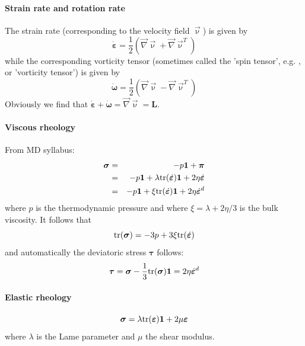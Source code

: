 
\paragraph{Strain rate and rotation rate}

The strain rate (corresponding to the velocity field $\vec\upnu$) is given by 
\[
\dot{\bm \varepsilon} = \frac12 ( \vec\nabla \vec\upnu + \vec\nabla \vec\upnu^T) 
\]
while the corresponding vorticity tensor
(sometimes called the 'spin tensor', e.g. \cite{moql07}, or 'vorticity tensor')  is given by
\[
\dot{\bm \omega} = \frac12 \left( \vec\nabla \vec\upnu - \vec\nabla \vec\upnu^T \right) 
\]
Obviously we find that $\dot{\bm \varepsilon}+\dot{\bm \omega}=\vec\nabla \vec\upnu  = {\bm L}$.



\paragraph{Viscous rheology}

From MD syllabus:
\begin{eqnarray}
{\bm \sigma} 
&=& -p {\bm 1} + {\bm \pi} \nonumber\\
&=& -p {\bm 1} + \lambda {\rm tr}(\dot{\bm \varepsilon}) {\bm 1} + 2 \eta \dot{\bm \varepsilon} \nonumber\\
&=& -p {\bm 1} + \xi {\rm tr}(\dot{\bm \varepsilon}) {\bm 1} + 2 \eta \dot{\bm \varepsilon}^d 
\end{eqnarray}
where $p$ is the thermodynamic pressure and 
where $\xi=\lambda+2\eta/3$ is the bulk viscosity. It follows that 
\begin{equation}
{\rm tr}({\bm \sigma}) = -3p + 3 \xi {\rm tr}(\dot{\bm \varepsilon}) \label{eq:trsigmav}
\end{equation}
and automatically the deviatoric stress ${\bm \tau}$ follows:
\begin{equation}
{\bm \tau} = {\bm \sigma} - \frac13 {\rm tr}({\bm \sigma}) {\bm 1} = 2 \eta \dot{\bm \varepsilon}^d \label{eq:ve:tauv}
\end{equation}


\paragraph{Elastic rheology}

\begin{equation}
{\bm \sigma} = \lambda {\rm tr}({\bm \varepsilon}) {\bm 1} + 2 \mu {\bm \varepsilon}
\end{equation}
where $\lambda$ is the Lame parameter and $\mu$ the shear modulus.

